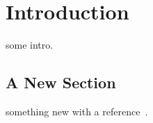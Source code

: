\chapter{Introduction}
\label{chap:intro}

some intro. 

\section{A New Section}
\label{sec:newsection}
something new with a reference~\cite{Trihinas2015}.
